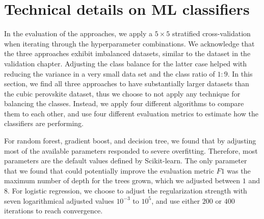 

\section{Technical details on ML classifiers}


In the evaluation of the approaches, we apply a $5\times 5$ stratified cross-validation when iterating through the hyperparameter combinations. We acknowledge that the three approaches exhibit imbalanced datasets, similar to the dataset in the validation chapter. Adjusting the class balance for the latter case helped with reducing the variance in a very small data set and the class ratio of $1:9$. In this section, we find all three approaches to have substantially larger datasets than the cubic perovskite dataset, thus we choose to not apply any technique for balancing the classes. Instead, we apply four different algorithms to compare them to each other, and use four different evaluation metrics to estimate how the classifiers are performing. %

For random forest, gradient boost, and decision tree, we found that by adjusting most of the available parameters responded to severe overfitting. Therefore, most parameters are the default values defined by Scikit-learn. The only parameter that we found that could potentially improve the evaluation metric $F1$ was the maximum number of depth for the trees grown, which we adjusted between $1$ and $8$. For logistic regression, we choose to adjust the regularization strength with seven logarithmical adjusted values $10^{-3}$ to $10^{5}$, and use either $200$ or $400$ iterations to reach convergence.

